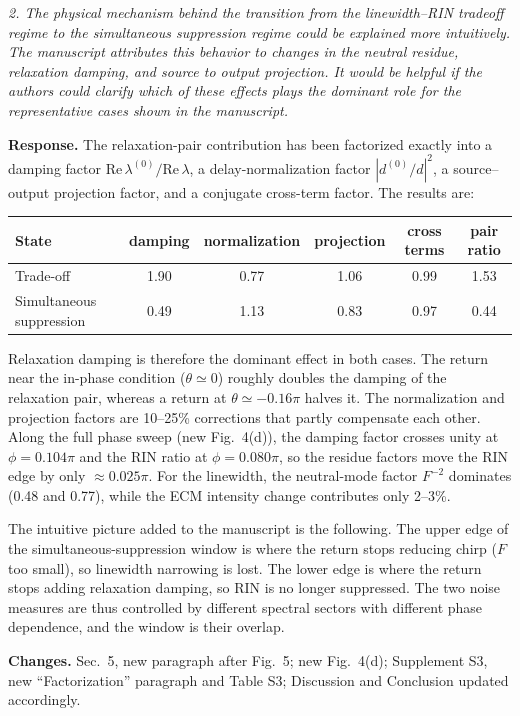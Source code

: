 \documentclass[11pt]{article}
\newenvironment{comment}{\par\medskip\noindent\begin{minipage}{\linewidth}\color{rc}\itshape}{\end{minipage}\par\smallskip}
\newcommand{\resp}{\noindent\textbf{Response.} }
\newcommand{\chg}{\par\noindent\textbf{Changes.} }
\begin{document}
\begin{comment}2. The physical mechanism behind the transition from the linewidth--RIN tradeoff regime to the simultaneous suppression regime could be explained more intuitively. The manuscript attributes this behavior to changes in the neutral residue, relaxation damping, and source to output projection. It would be helpful if the authors could clarify which of these effects plays the dominant role for the representative cases shown in the manuscript.\end{comment}
\resp The relaxation-pair contribution has been factorized exactly into a damping factor $\mathrm{Re}\,\lambda^{(0)}/\mathrm{Re}\,\lambda$, a delay-normalization factor $|d^{(0)}/d|^2$, a source--output projection factor, and a conjugate cross-term factor. The results are:

\begin{center}
\begin{tabular}{lccccc}
\toprule
State & damping & normalization & projection & cross terms & pair ratio\\
\midrule
Trade-off & 1.90 & 0.77 & 1.06 & 0.99 & 1.53\\
Simultaneous suppression & 0.49 & 1.13 & 0.83 & 0.97 & 0.44\\
\bottomrule
\end{tabular}
\end{center}

Relaxation damping is therefore the dominant effect in both cases. The return near the in-phase condition ($\theta\simeq0$) roughly doubles the damping of the relaxation pair, whereas a return at $\theta\simeq-0.16\pi$ halves it. The normalization and projection factors are 10--25\% corrections that partly compensate each other. Along the full phase sweep (new Fig.~4(d)), the damping factor crosses unity at $\phi=0.104\pi$ and the RIN ratio at $\phi=0.080\pi$, so the residue factors move the RIN edge by only $\approx0.025\pi$. For the linewidth, the neutral-mode factor $F^{-2}$ dominates (0.48 and 0.77), while the ECM intensity change contributes only 2--3\%.

The intuitive picture added to the manuscript is the following. The upper edge of the simultaneous-suppression window is where the return stops reducing chirp ($F$ too small), so linewidth narrowing is lost. The lower edge is where the return stops adding relaxation damping, so RIN is no longer suppressed. The two noise measures are thus controlled by different spectral sectors with different phase dependence, and the window is their overlap.
\chg Sec.~5, new paragraph after Fig.~5; new Fig.~4(d); Supplement S3, new ``Factorization'' paragraph and Table S3; Discussion and Conclusion updated accordingly.
\end{document}
